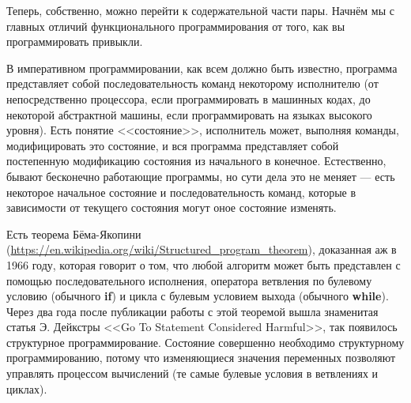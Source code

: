 \documentclass[a5paper]{article}
\begin{document}
Теперь, собственно, можно перейти к содержательной части пары. Начнём мы с главных отличий функционального программирования от того, как вы программировать привыкли.

В императивном программировании, как всем должно быть известно, программа представляет собой последовательность команд некоторому исполнителю (от непосредственно процессора, если программировать в машинных кодах, до некоторой абстрактной машины, если программировать на языках высокого уровня). Есть понятие <<состояние>>, исполнитель может, выполняя команды, модифицировать это состояние, и вся программа представляет собой постепенную модификацию состояния из начального в конечное. Естественно, бывают бесконечно работающие программы, но сути дела это не меняет --- есть некоторое начальное состояние и последовательность команд, которые в зависимости от текущего состояния могут оное состояние изменять.

Есть теорема Бёма-Якопини (\url{https://en.wikipedia.org/wiki/Structured_program_theorem}), доказанная аж в 1966 году, которая говорит о том, что любой алгоритм может быть представлен с помощью последовательного исполнения, оператора ветвления по булевому условию (обычного \textbf{if}) и цикла с булевым условием выхода (обычного \textbf{while}). Через два года после публикации работы с этой теоремой вышла знаменитая статья Э. Дейкстры <<Go To Statement Considered Harmful>>, так появилось структурное программирование. Состояние совершенно необходимо структурному программированию, потому что изменяющиеся значения переменных позволяют управлять процессом вычислений (те самые булевые условия в ветвлениях и циклах). 
\end{document}
